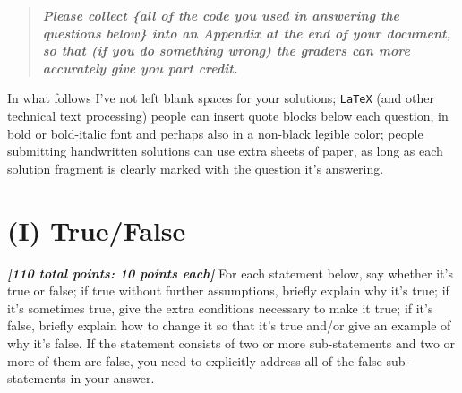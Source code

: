 \documentclass[12pt]{article}
\newcommand{\bi}[1]{\b{\i{#1}}}
\renewcommand{\b}[1]{\textbf{#1}}
\renewcommand{\i}[1]{\textit{#1}}
\renewcommand{\t}[1]{\texttt{#1}}
\begin{document}
\begin{quote}

\bi{Please collect \{all of the code you used in answering the questions below\} into an Appendix at the end of your document, so that (if you do something wrong) the graders can more accurately give you part credit.} 

\end{quote}

In what follows I've not left blank spaces for your solutions; \t{LaTeX} (and other technical text processing) people can insert quote blocks below each question, in bold or bold-italic font and perhaps also in a non-black legible color; people submitting handwritten solutions can use extra sheets of paper, as long as each solution fragment is clearly marked with the question it's answering. 

\section*{(I) True/False}

\bi{[110 total points: 10 points each]} For each statement below, say whether it's true or false; if true without further assumptions, briefly explain why it's true; if it's sometimes true, give the extra conditions necessary to make it true; if it's false, briefly explain how to change it so that it's true and/or give an example of why it's false. If the statement consists of two or more sub-statements and two or more of them are false, you need to explicitly address all of the false sub-statements in your answer.
\end{document}
